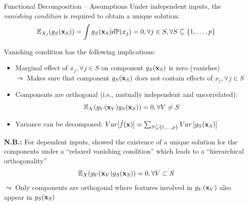 \documentclass[11pt,compress,t,notes=noshow, aspectratio=169, xcolor=table]{beamer}
\begin{document}
\begin{frame}
\end{frame}

\begin{frame}{Functional Decomposition -- Assumptions}
Under independent inputs, the \textit{vanishing condition} is required to obtain a unique solution:
$$\mathbb{E}_{X_j} (g_{S}(\xv_S)) = \int g_{S}(\xv_S) d \mathbb{P}(x_j) = 0, \forall j \in S, \forall S \subseteq \{1, \ldots, p\}$$

\pause 

Vanishing condition has the following implications:

\begin{itemize}
    \item Marginal effect of $x_j, \forall j \in S$ on component $g_S(\xv_S)$ is zero (vanishes)\\
    $\leadsto$ Makes sure that component $g_S(\xv_S)$ does not contain effects of $x_j, \forall j \in S$
    \item Components are orthogonal (i.e., mutually independent and uncorrelated):
    $$\mathbb{E}_{X} (g_{V}(\xv_V) g_{S}(\xv_S)) = 0, \forall V \neq S$$
    \item Variance can be decomposed:
$ Var[\fh(\xv)] =  \textstyle\sum_{S \subseteq \{1,\ldots,p\}}  Var\left[ g_{S}(\xv_S)\right]$
\end{itemize}

\pause 

\textbf{N.B.:} For dependent inputs,  showed the existence of a unique solution for the components under a ``relaxed vanishing condition'' which leads to a ``hierarchical orthogonality''
$$\mathbb{E}_{X} (g_{V}(\xv_V) g_{S}(\xv_S)) = 0, \forall V \subset S$$
$\leadsto$ Only components are orthogonal where features involved in $g_{V}(\xv_V)$ also appear in $g_{S}(\xv_S)$
\end{frame}
\end{document}
